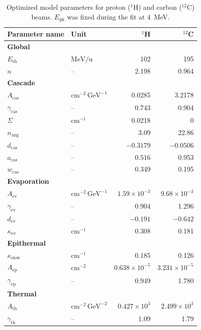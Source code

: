 \begin{table}[t]
\centering
\setlength{\belowcaptionskip}{6pt}
\caption{Optimized model parameters for proton (${}^{1}$H) and carbon (${}^{12}$C) beams. $E_\mathrm{pk}$ was fixed during the fit at \qty{4}{MeV}.}
\label{tab:model_params}
\begin{tabular}{l l r r}
\toprule
Parameter name & Unit & ${}^{1}$H & ${}^{12}$C \\
\midrule
\multicolumn{4}{l}{\textbf{Global}} \\
$E_{\mathrm{th}}$ & $\mathrm{MeV/u}$ & 102 & 195 \\
$n$ & -- & 2.198 & 0.964 \\
\midrule
\multicolumn{4}{l}{\textbf{Cascade}} \\
$A_{\mathrm{cas}}$ & $\mathrm{cm^{-2}\,GeV^{-1}}$ & 0.0285 & 3.2178 \\
$\gamma_{\mathrm{cas}}$ & -- & 0.743 & 0.904 \\
$\Sigma$ & $\mathrm{cm^{-1}}$ & 0.0218 & 0 \\
$n_{\mathrm{ang}}$ & -- & 3.09 & 22.86 \\
$d_{\mathrm{cas}}$ & -- & $-0.3179$ & $-0.0506$ \\
$a_{\mathrm{cas}}$ & -- & 0.516 & 0.953 \\
$w_{\mathrm{cas}}$ & -- & 0.349 & 0.195 \\
\midrule
\multicolumn{4}{l}{\textbf{Evaporation}} \\
$A_{\mathrm{ev}}$ & $\mathrm{cm^{-2}\,GeV^{-1}}$ & $1.59\times10^{-3}$ & $9.68\times10^{-3}$ \\
$\gamma_{\mathrm{ev}}$ & -- & 0.904 & 1.296 \\
$d_{\mathrm{ev}}$ & -- & $-0.191$ & $-0.642$ \\
$\kappa_{\mathrm{ev}}$ & $\mathrm{cm^{-1}}$ & 0.308 & 0.181 \\
\midrule
\multicolumn{4}{l}{\textbf{Epithermal}} \\
$\kappa_{\mathrm{slow}}$ & $\mathrm{cm^{-1}}$ & 0.185 & 0.126 \\
$A_{\mathrm{ep}}$ & $\mathrm{cm^{-2}}$ & $0.638\times10^{-5}$ & $3.231\times10^{-5}$ \\
$\gamma_{\mathrm{ep}}$ & -- & 0.949 & 1.780 \\
\midrule
\multicolumn{4}{l}{\textbf{Thermal}} \\
$A_{\mathrm{th}}$ & $\mathrm{cm^{-2}\,GeV^{-2}}$ & $0.427\times10^{3}$ & $2.499\times10^{3}$ \\
$\gamma_{\mathrm{th}}$ & -- & 1.09 & 1.79 \\
\bottomrule
\end{tabular}
\end{table}
